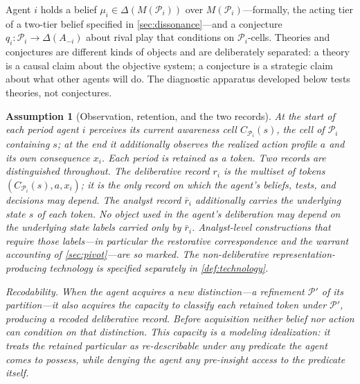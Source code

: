 \documentclass[11pt]{article}
\newtheorem{assumption}{Assumption}[section]
\theoremstyle{definition}
\begin{document}
Agent $i$ holds a belief $\mu_i\in\Delta(M(\mathcal P_i))$ over $M(\mathcal P_i)$---formally, the acting tier of a two-tier belief specified in \cref{sec:dissonance}---and a conjecture $q_i:\mathcal P_i\to\Delta(A_{-i})$ about rival play that conditions on $\mathcal P_i$-cells.
Theories and conjectures are different kinds of objects and are deliberately separated: a theory is a causal claim about the objective system; a conjecture is a strategic claim about what other agents will do.
The diagnostic apparatus developed below tests theories, not conjectures.

\begin{assumption}[Observation, retention, and the two records]
\label{ass:observation}
At the start of each period agent $i$ perceives its current awareness cell $C_{\mathcal P_i}(s)$, the cell of $\mathcal P_i$ containing $s$; at the end it additionally observes the realized action profile $a$ and its own consequence $x_i$.
Each period is retained as a token.
Two records are distinguished throughout.
The \emph{deliberative record} $r_i$ is the multiset of tokens $(C_{\mathcal P_i}(s),a,x_i)$; it is the only record on which the agent's beliefs, tests, and decisions may depend.
The \emph{analyst record} $\bar r_i$ additionally carries the underlying state $s$ of each token.
No object used in the agent's deliberation may depend on the underlying state labels carried only by \(\bar r_i\).
Analyst-level constructions that require those labels---in particular the restorative correspondence and the warrant accounting of \cref{sec:pivot}---are so marked.
The non-deliberative representation-producing technology is specified separately in \cref{def:technology}.

\emph{Recodability.}
When the agent acquires a new distinction---a refinement $\mathcal P'$ of its partition---it also acquires the capacity to classify each retained token under $\mathcal P'$, producing a recoded deliberative record.
Before acquisition neither belief nor action can condition on that distinction.
This capacity is a modeling idealization: it treats the retained particular as re-describable under any predicate the agent comes to possess, while denying the agent any pre-insight access to the predicate itself.
\end{assumption}
\end{document}
